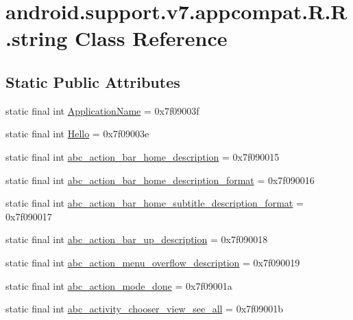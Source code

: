 \hypertarget{classandroid_1_1support_1_1v7_1_1appcompat_1_1_r_1_1string}{
\section{android.support.v7.appcompat.R.R.string Class Reference}
\label{classandroid_1_1support_1_1v7_1_1appcompat_1_1_r_1_1string}
}
\subsection*{Static Public Attributes}
\begin{CompactItemize}
\item 
static final int \hyperlink{classandroid_1_1support_1_1v7_1_1appcompat_1_1_r_1_1string_525293df089efd16a91add9118d75a73}{ApplicationName} = 0x7f09003f
\item 
static final int \hyperlink{classandroid_1_1support_1_1v7_1_1appcompat_1_1_r_1_1string_642b4ddcf5f4e1a113fba280be3b4888}{Hello} = 0x7f09003e
\item 
static final int \hyperlink{classandroid_1_1support_1_1v7_1_1appcompat_1_1_r_1_1string_8a46dbe0db5075d598ea09824e3b9805}{abc\_\-action\_\-bar\_\-home\_\-description} = 0x7f090015
\item 
static final int \hyperlink{classandroid_1_1support_1_1v7_1_1appcompat_1_1_r_1_1string_6b9f13597f4e52dac4f162028f12676f}{abc\_\-action\_\-bar\_\-home\_\-description\_\-format} = 0x7f090016
\item 
static final int \hyperlink{classandroid_1_1support_1_1v7_1_1appcompat_1_1_r_1_1string_22638c0135c034493f0fd6795d0dfe76}{abc\_\-action\_\-bar\_\-home\_\-subtitle\_\-description\_\-format} = 0x7f090017
\item 
static final int \hyperlink{classandroid_1_1support_1_1v7_1_1appcompat_1_1_r_1_1string_19813a5c6d07919c784f21a3df9a7b94}{abc\_\-action\_\-bar\_\-up\_\-description} = 0x7f090018
\item 
static final int \hyperlink{classandroid_1_1support_1_1v7_1_1appcompat_1_1_r_1_1string_801d008a65e21e989749585067976f97}{abc\_\-action\_\-menu\_\-overflow\_\-description} = 0x7f090019
\item 
static final int \hyperlink{classandroid_1_1support_1_1v7_1_1appcompat_1_1_r_1_1string_eaed2537111b4a30cf63d81bd54e23a8}{abc\_\-action\_\-mode\_\-done} = 0x7f09001a
\item 
static final int \hyperlink{classandroid_1_1support_1_1v7_1_1appcompat_1_1_r_1_1string_ad6b1b30218df19ada13a5b77ea5229f}{abc\_\-activity\_\-chooser\_\-view\_\-see\_\-all} = 0x7f09001b

\end{CompactItemize}
